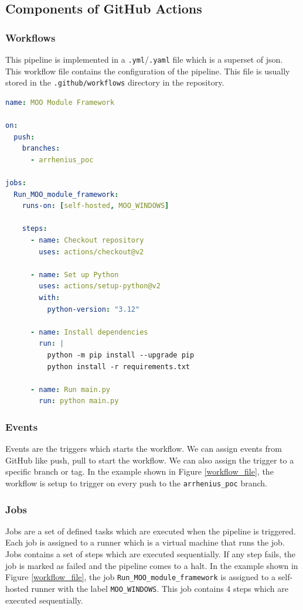 \subsection{Components of GitHub Actions}
\subsubsection{Workflows}
This pipeline is implemented in a \texttt{.yml}/\texttt{.yaml} file which is a superset of \acrshort{json}. This workflow file contains the configuration of 
the pipeline. This file is usually stored in the \texttt{.github/workflows} directory in the repository. 

\renewcommand{\lstlistingname}{Code}
\begin{lstlisting}[language=yaml, caption=Example of a GitHub Actions workflow file, label=workflow_file]
name: MOO Module Framework

on:
  push:
    branches:
      - arrhenius_poc

jobs:
  Run_MOO_module_framework:
    runs-on: [self-hosted, MOO_WINDOWS]

    steps:
      - name: Checkout repository
        uses: actions/checkout@v2

      - name: Set up Python
        uses: actions/setup-python@v2
        with:
          python-version: "3.12"

      - name: Install dependencies
        run: |
          python -m pip install --upgrade pip
          python install -r requirements.txt

      - name: Run main.py
        run: python main.py
\end{lstlisting}  

\subsubsection{Events}
Events are the triggers which starts the workflow. We can assign events from GitHub like push, pull to start the workflow. We can also assign the trigger to a 
specific branch or tag. In the example shown in Figure \ref{workflow_file}, the workflow is setup to trigger on every push to the \texttt{arrhenius\_poc} branch. 

\subsubsection{Jobs}
Jobs are a set of defined tasks which are executed when the pipeline is triggered. Each job is assigned to a runner which is a virtual machine that runs the 
job. Jobs contains a set of steps which are executed sequentially. If any step fails, the job is marked as failed and the pipeline comes to a halt. In the example
shown in Figure \ref{workflow_file}, the job \texttt{Run\_MOO\_module\_framework} is assigned to a self-hosted runner with the label \texttt{MOO\_WINDOWS}. This 
job contains 4 steps which are executed sequentially.

